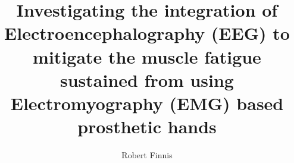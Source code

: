 \title{Investigating the integration of Electroencephalography (EEG) to mitigate the muscle fatigue sustained from using Electromyography (EMG) based prosthetic hands}

\author{Robert Finnis}





\subject{EEG-EMG Hybrid control systems} 